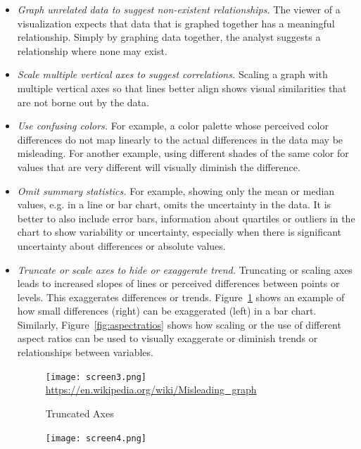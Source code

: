 \begin{itemize}
	\item \emph{Graph unrelated data to suggest non-existent relationships.} The viewer of a visualization expects that data that is graphed together has a meaningful relationship. Simply by graphing data together, the analyst suggests a relationship where none may exist.
	\item \emph{Scale multiple vertical axes to suggest correlations.} Scaling a graph with multiple vertical axes so that lines better align shows visual similarities that are not borne out by the data.
	\item \emph{Use confusing colors.} For example, a color palette whose perceived color differences do not map linearly to the actual differences in the data may be misleading. For another example, using different shades of the same color for values that are very different will visually diminish the difference.
	\item \emph{Omit summary statistics.} For example, showing only the mean or median values, e.g. in a line or bar chart, omits the uncertainty in the data. It is better to also include error bars, information about quartiles or outliers in the chart to show variability or uncertainty, especially when there is significant uncertainty about differences or absolute values.
	\item \emph{Truncate or scale axes to hide or exaggerate trend.} Truncating or scaling axes leads to increased slopes of lines or perceived differences between points or levels. This exaggerates differences or trends. Figure~\ref{fig:truncated} shows an example of how small differences (right) can be exaggerated (left) in a bar chart. Similarly, Figure~\ref{fig:aspectratios} shows how scaling or the use of different aspect ratios can be used to visually exaggerate or diminish trends or relationships between variables.
\begin{figure}
\centering
\texttt{[image: screen3.png]} \\

\scriptsize\url{https://en.wikipedia.org/wiki/Misleading_graph}
\caption{Truncated Axes}
\label{fig:truncated}
\end{figure}
\begin{figure}
\centering
\texttt{[image: screen4.png]}


\end{figure}
\end{itemize}

